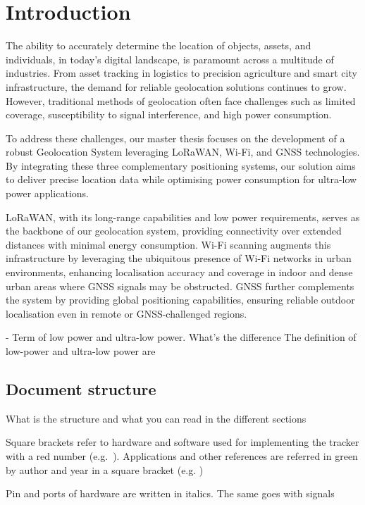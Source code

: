 \section{Introduction} \label{sec:introduction}
The ability to accurately determine the location of objects, assets, and individuals, in today's digital landscape, is paramount across a multitude of industries. From asset tracking in logistics to precision agriculture and smart city infrastructure, the demand for reliable geolocation solutions continues to grow. However, traditional methods of geolocation often face challenges such as limited coverage, susceptibility to signal interference, and high power consumption.

To address these challenges, our master thesis focuses on the development of a robust Geolocation System leveraging \ac{LoRaWAN}, Wi-Fi, and \ac{GNSS} technologies. By integrating these three complementary positioning systems, our solution aims to deliver precise location data while optimising power consumption for ultra-low power applications.

\ac{LoRaWAN}, with its long-range capabilities and low power requirements, serves as the backbone of our geolocation system, providing connectivity over extended distances with minimal energy consumption. Wi-Fi scanning augments this infrastructure by leveraging the ubiquitous presence of Wi-Fi networks in urban environments, enhancing localisation accuracy and coverage in indoor and dense urban areas where \ac{GNSS} signals may be obstructed. \ac{GNSS} further complements the system by providing global positioning capabilities, ensuring reliable outdoor localisation even in remote or \ac{GNSS}-challenged regions.


- Term of low power and ultra-low power. What's the difference
The definition of low-power and ultra-low power are


\subsection{Document structure}
What is the structure and what you can read in the different sections

Square brackets refer to hardware and software used for implementing the tracker with a red number (e.g.~). Applications and other references are referred in green by author and year in a square bracket (e.g. \cite{LR1110_user_manual})

Pin and ports of hardware are written in italics. The same goes with signals

